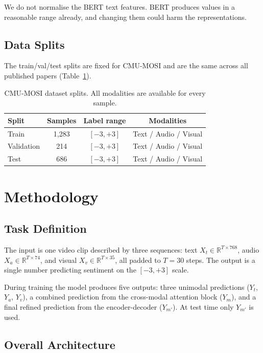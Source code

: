 \documentclass[11pt,twocolumn]{article}
\begin{document}
We do not normalise the BERT text features. BERT produces values in a reasonable range already, and changing them could harm the representations.

\subsection{Data Splits}

The train/val/test splits are fixed for CMU-MOSI and are the same across all published papers (Table~\ref{tab:dataset}).

\begin{table}[h]
\centering
\small
\begin{tabular}{lccc}
\toprule
\textbf{Split} & \textbf{Samples} & \textbf{Label range} & \textbf{Modalities} \\
\midrule
Train      & 1,283 & $[-3, +3]$ & Text / Audio / Visual \\
Validation & 214   & $[-3, +3]$ & Text / Audio / Visual \\
Test       & 686   & $[-3, +3]$ & Text / Audio / Visual \\
\bottomrule
\end{tabular}
\caption{CMU-MOSI dataset splits. All modalities are available for every sample.}
\label{tab:dataset}
\end{table}

\section{Methodology}
\label{sec:method}

\subsection{Task Definition}

The input is one video clip described by three sequences: text $X_t \in \mathbb{R}^{T \times 768}$, audio $X_a \in \mathbb{R}^{T \times 74}$, and visual $X_v \in \mathbb{R}^{T \times 35}$, all padded to $T = 30$ steps. The output is a single number predicting sentiment on the $[-3, +3]$ scale.

During training the model produces five outputs: three unimodal predictions ($Y_t$, $Y_a$, $Y_v$), a combined prediction from the cross-modal attention block ($Y_m$), and a final refined prediction from the encoder-decoder ($Y_{m'}$). At test time only $Y_{m'}$ is used.

\subsection{Overall Architecture}
\end{document}
